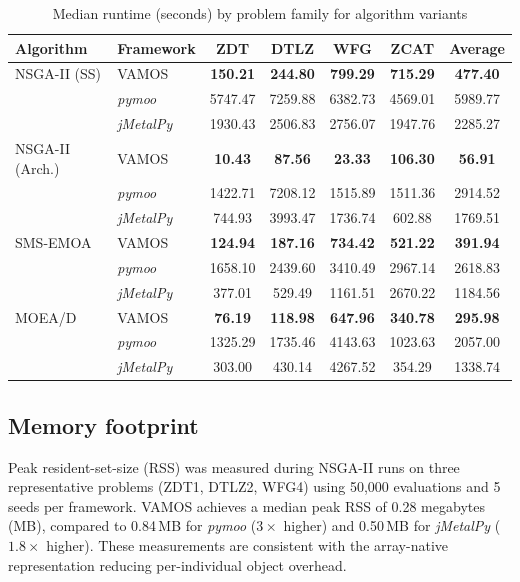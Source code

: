 \documentclass[journal]{IEEEtran}
\newcommand{\VAMOS}{VAMOS}
\begin{document}
\begin{table}[htbp]
\centering
\scriptsize
\setlength{\tabcolsep}{3pt}
\caption{Median runtime (seconds) by problem family for algorithm variants}
\label{tab:frameworks_perf_variants}
\begin{tabular}{@{}llccccc@{}}
\toprule
\textbf{Algorithm} & \textbf{Framework} & \textbf{ZDT} & \textbf{DTLZ} & \textbf{WFG} & \textbf{ZCAT} & \textbf{Average} \\
\midrule
NSGA-II (SS) & VAMOS & \textbf{150.21} & \textbf{244.80} & \textbf{799.29} & \textbf{715.29} & \textbf{477.40} \\
 & \textit{pymoo}  & 5747.47 & 7259.88 & 6382.73 & 4569.01 & 5989.77 \\
 & \textit{jMetalPy} & 1930.43 & 2506.83 & 2756.07 & 1947.76 & 2285.27 \\
\midrule
NSGA-II (Arch.) & VAMOS & \textbf{10.43} & \textbf{87.56} & \textbf{23.33} & \textbf{106.30} & \textbf{56.91} \\
 & \textit{pymoo}  & 1422.71 & 7208.12 & 1515.89 & 1511.36 & 2914.52 \\
 & \textit{jMetalPy} & 744.93 & 3993.47 & 1736.74 & 602.88 & 1769.51 \\
\midrule
SMS-EMOA & VAMOS & \textbf{124.94} & \textbf{187.16} & \textbf{734.42} & \textbf{521.22} & \textbf{391.94} \\
 & \textit{pymoo}  & 1658.10 & 2439.60 & 3410.49 & 2967.14 & 2618.83 \\
 & \textit{jMetalPy} & 377.01 & 529.49 & 1161.51 & 2670.22 & 1184.56 \\
\midrule
MOEA/D & VAMOS & \textbf{76.19} & \textbf{118.98} & \textbf{647.96} & \textbf{340.78} & \textbf{295.98} \\
 & \textit{pymoo}  & 1325.29 & 1735.46 & 4143.63 & 1023.63 & 2057.00 \\
 & \textit{jMetalPy} & 303.00 & 430.14 & 4267.52 & 354.29 & 1338.74 \\
\bottomrule
\end{tabular}
\end{table}

\subsection{Memory footprint}

Peak resident-set-size (RSS) was measured during NSGA-II runs on three representative problems (ZDT1, DTLZ2, WFG4) using 50{,}000 evaluations and 5 seeds per framework. \VAMOS{} achieves a median peak RSS of 0.28 megabytes (MB), compared to 0.84\,MB for \textit{pymoo}  ($3\times$ higher) and 0.50\,MB for \textit{jMetalPy} ($1.8\times$ higher). These measurements are consistent with the array-native representation reducing per-individual object overhead.
\end{document}
